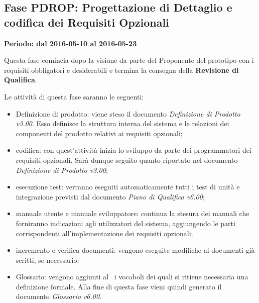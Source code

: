 \documentclass[../PianoProgetto.tex]{subfiles}
\begin{document}
	\subsection{Fase PDROP: Progettazione di Dettaglio e codifica dei Requisiti Opzionali}
		\textbf{Periodo: dal 2016-05-10 al 2016-05-23}
		
		Questa fase comincia dopo la visione da parte del Proponente del prototipo con i requisiti obbligatori e desiderabili e termina la consegna della \textbf{Revisione di Qualifica}.

		Le attività di questa fase saranno le seguenti:
		\begin{itemize}
			\item Definizione di prodotto: viene steso il documento \textit{Definizione di Prodotto v3.00}. Esso definisce la struttura interna del sistema e le relazioni dei componenti del prodotto relativi ai requisiti opzionali;

			\item codifica: con quest'attività inizia lo sviluppo da parte dei programmatori dei requisiti opzionali. Sarà dunque seguito quanto riportato nel documento \textit{Definizione di Prodotto v3.00};

			\item esecuzione test: verranno eseguiti automaticamente tutti i test di unità e integrazione previsti dal documento \textit{Piano di Qualifica v6.00};

			\item manuale utente e manuale sviluppatore: continua la stesura dei manuali che forniranno indicazioni agli utilizzatori del sistema, aggiungendo le parti corrispondenti all'implementazione dei requisiti opzionali;

			\item incremento e verifica documenti: vengono eseguite modifiche ai documenti già scritti, se necessario;
			
			\item Glossario: vengono aggiunti al \glossario\ i vocaboli dei quali si ritiene necessaria una definizione formale. Alla fine di questa fase vieni quindi generato il documento \textit{Glossario v6.00}.
		\end{itemize}
		
		
\end{document}
